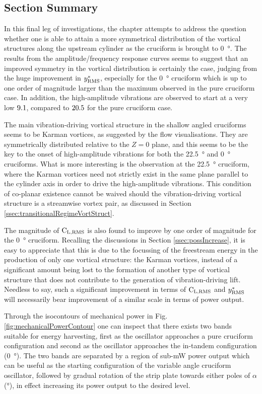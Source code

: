 \documentclass[oneside]{utmthesis}
\begin{document}
\subsection{Section Summary} \label{ssec:chapSumShallow}
In this final leg of investigations, the chapter attempts to address the question whether one is able to attain a more symmetrical distribution of the vortical structures along the upstream cylinder as the cruciform is brought to \SI{0}{\degree}. The results from the amplitude/frequency response curves seems to suggest that an improved symmetry in the vortical distribution is certainly the case, judging from the huge improvement in $y^{*}_{\text{RMS}}$, especially for the \SI{0}{\degree} cruciform which is up to one order of magnitude larger than the maximum observed in the pure cruciform case. In addition, the high-amplitude vibrations are observed to start at a very low $9.1$, compared to $20.5$ for the pure cruciform case.

The main vibration-driving vortical structure in the shallow angled cruciforms seems to be Karman vortices, as suggested by the flow visualisations. They are symmetrically distributed relative to the $Z=0$ plane, and this seems to be the key to the onset of high-amplitude vibrations for both the \SI{22.5}{\degree} and \SI{0}{\degree} cruciforms. What is more interesting is the observation at the \SI{22.5}{\degree} cruciform, where the Karman vortices need not strictly exist in the same plane parallel to the cylinder axis in order to drive the high-amplitude vibrations. This condition of co-planar existence cannot be waived should the vibration-driving vortical structure is a streamwise vortex pair, as discussed in Section \ref{ssec:transitionalRegimeVortStruct}.

The magnitude of $\text{C}_{\text{L,RMS}}$ is also found to improve by one order of magnitude for the \SI{0}{\degree} cruciform. Recalling the discussions in Section \ref{ssec:possIncrease}, it is easy to appreciate that this is due to the focussing of the freestream energy in the production of only one vortical structure: the Karman vortices, instead of a significant amount being lost to the formation of another type of vortical structure that does not contribute to the generation of vibration-driving lift. Needless to say, such a significant improvement in terms of $\text{C}_{\text{L,RMS}}$ and $y^{*}_{\text{RMS}}$ will necessarily bear improvement of a similar scale in terms of power output.

Through the isocontours of mechanical power in Fig. \ref{fig:mechanicalPowerContour} one can inspect that there exists two bands suitable for energy harvesting, first as the oscillator approaches a pure cruciform configuration and second as the oscillator approaches the in-tandem configuration (\SI{0}{\degree}). The two bands are separated by a region of sub-mW power output which can be useful as the starting configuration of the variable angle cruciform oscillator, followed by gradual rotation of the strip plate towards either poles of $\alpha$ (\si{\degree}), in effect increasing its power output to the desired level.
\end{document}
